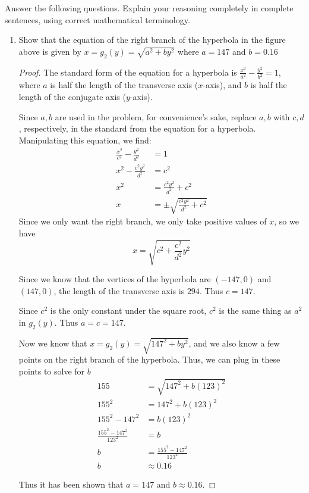 \documentclass{article}
\begin{document}
Answer the following questions. Explain your reasoning completely in complete sentences, using correct mathematical terminology.
\begin{enumerate}
    \item Show that the equation of the right branch of the hyperbola in the figure above is given
by $x=g_2(y) = \sqrt{a^2+by^2}$ where $a = 147$ and $b = 0.16$
\begin{proof}

The standard form of the equation for a hyperbola is $\frac{x^2}{a^2}-\frac{y^2}{b^2}=1$, where $a$ is half the length of the transverse axis ($x$-axis), and $b$ is half the length of the conjugate axis ($y$-axis). 

Since $a, b$ are used in the problem, for convenience's sake, replace $a,b$ with $c, d$, respectively, in the standard from the equation for a hyperbola. Manipulating this equation, we find:
\begin{align*}
    \frac{x^2}{c^2}-\frac{y^2}{d^2}&=1\\
    x^2-\frac{c^2y^2}{d^2}&=c^2\\
    x^2&=\frac{c^2y^2}{d^2}+c^2\\
    x&=\pm\sqrt{\frac{c^2y^2}{d^2}+c^2}
\end{align*}
Since we only want the right branch, we only take positive values of $x$, so we have
$$x=\sqrt{c^2+\frac{c^2}{d^2}y^2}$$

Since we know that the vertices of the hyperbola are $(-147, 0)$ and $(147,0)$, the length of the transverse axis is $294$. Thus $c=147$. 

Since $c^2$ is the only constant under the square root, $c^2$ is the same thing as $a^2$ in $g_2(y)$. Thus $a=c=147$.

Now we know that $x=g_2(y)=\sqrt{147^2+by^2}$, and we also know a few points on the right branch of the hyperbola. Thus, we can plug in these points to solve for $b$
\begin{align*}
    155&=\sqrt{147^2+b(123)^2}\\
    155^2&=147^2+b(123)^2\\
    155^2-147^2&=b(123)^2\\
    \frac{155^2-147^2}{123^2}&=b\\
    b&=\frac{155^2-147^2}{123^2}\\
    b&\approx0.16
\end{align*}

Thus it has been shown that $a=147$ and $b\approx0.16.$

\end{proof}



\end{enumerate}
\end{document}
